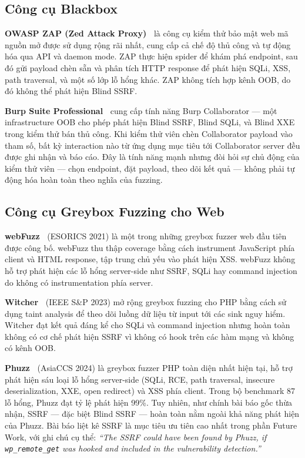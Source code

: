 \subsection{Công cụ Blackbox}

\textbf{OWASP ZAP (Zed Attack Proxy)~\cite{zapdevteam2023}} là công cụ kiểm thử
bảo mật web mã nguồn mở được sử dụng rộng rãi nhất, cung cấp cả chế độ thủ công và
tự động hóa qua API và daemon mode. ZAP thực hiện spider để khám phá endpoint, sau đó
gửi payload chèn sẵn và phân tích HTTP response để phát hiện SQLi, XSS, path
traversal, và một số lớp lỗ hổng khác. ZAP không tích hợp kênh OOB, do đó không thể
phát hiện Blind SSRF.

\textbf{Burp Suite Professional~\cite{portswigger2023burp}} cung cấp tính năng Burp
Collaborator --- một infrastructure OOB cho phép phát hiện Blind SSRF, Blind SQLi, và
Blind XXE trong kiểm thử bán thủ công. Khi kiểm thử viên chèn Collaborator payload
vào tham số, bất kỳ interaction nào từ ứng dụng mục tiêu tới Collaborator server đều
được ghi nhận và báo cáo. Đây là tính năng mạnh nhưng đòi hỏi sự chủ động của kiểm
thử viên --- chọn endpoint, đặt payload, theo dõi kết quả --- không phải tự động hóa
hoàn toàn theo nghĩa của fuzzing.

\subsection{Công cụ Greybox Fuzzing cho Web}

\textbf{webFuzz~\cite{vanrooij2021webfuzz}} (ESORICS 2021) là một trong những greybox
fuzzer web đầu tiên được công bố. webFuzz thu thập coverage bằng cách instrument
JavaScript phía client và HTML response, tập trung chủ yếu vào phát hiện XSS.
webFuzz không hỗ trợ phát hiện các lỗ hổng server-side như SSRF, SQLi hay command
injection do không có instrumentation phía server.

\textbf{Witcher~\cite{trickel2023witcher}} (IEEE S\&P 2023) mở rộng greybox fuzzing
cho PHP bằng cách sử dụng taint analysis để theo dõi luồng dữ liệu từ input tới các
sink nguy hiểm. Witcher đạt kết quả đáng kể cho SQLi và command injection nhưng hoàn
toàn không có cơ chế phát hiện SSRF vì không có hook trên các hàm mạng và không có
kênh OOB.

\textbf{Phuzz~\cite{neef2024phuzz}} (AsiaCCS 2024) là greybox fuzzer PHP toàn diện
nhất hiện tại, hỗ trợ phát hiện sáu loại lỗ hổng server-side (SQLi, RCE, path
traversal, insecure deserialization, XXE, open redirect) và XSS phía client. Trong
bộ benchmark 87 lỗ hổng, Phuzz đạt tỷ lệ phát hiện 99\%. Tuy nhiên, như chính bài
báo gốc thừa nhận, SSRF --- đặc biệt Blind SSRF --- hoàn toàn nằm ngoài khả năng
phát hiện của Phuzz. Bài báo liệt kê SSRF là mục tiêu ưu tiên cao nhất trong phần
Future Work, với ghi chú cụ thể: \textit{``The SSRF could have been found by Phuzz,
if \texttt{wp\_remote\_get} was hooked and included in the vulnerability detection.''}

